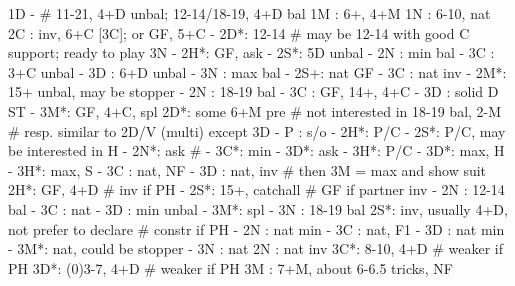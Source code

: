 1D -  # 11-21, 4+D unbal; 12-14/18-19, 4+D bal
1M : 6+, 4+M
1N : 6-10, nat
2C : inv, 6+C [3C]; or GF, 5+C
   - 2D*: 12-14  # may be 12-14 with good C support; ready to play 3N
        - 2H*: GF, ask
             - 2S*: 5D unbal
             - 2N : min bal
             - 3C : 3+C unbal
             - 3D : 6+D unbal
             - 3N : max bal
        - 2S+: nat GF
        - 3C : nat inv
   - 2M*: 15+ unbal, may be stopper
   - 2N : 18-19 bal
   - 3C : GF, 14+, 4+C
   - 3D : solid D ST
   - 3M*: GF, 4+C, spl
2D*: some 6+M pre  # not interested in 18-19 bal, 2-M
   # resp. similar to 2D/V (multi) except 3D
   - P  : s/o
   - 2H*: P/C
   - 2S*: P/C, may be interested in H
   - 2N*: ask  # 
        - 3C*: min
             - 3D*: ask
             - 3H*: P/C
        - 3D*: max, H
        - 3H*: max, S
   - 3C : nat, NF
   - 3D : nat, inv  # then 3M = max and show suit
2H*: GF, 4+D  # inv if PH
   - 2S*: 15+, catchall  # GF if partner inv
   - 2N : 12-14 bal
   - 3C : nat
   - 3D : min unbal
   - 3M*: spl
   - 3N : 18-19 bal
2S*: inv, usually 4+D, not prefer to declare  # constr if PH
   - 2N : nat min
   - 3C : nat, F1
   - 3D : nat min
   - 3M*: nat, could be stopper
   - 3N : nat
2N : nat inv
3C*: 8-10, 4+D  # weaker if PH
3D*: (0)3-7, 4+D  # weaker if PH
3M : 7+M, about 6-6.5 tricks, NF